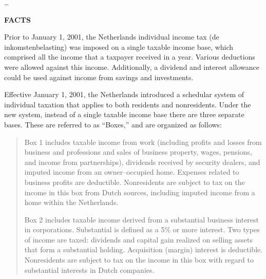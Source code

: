 \begin{select}
\ldots\\

\begin{center} \textbf{FACTS}
\end{center}

Prior to January 1, 2001, the Netherlands individual income tax (de inkomstenbelasting) was imposed on a single taxable income base, which comprised all the income that a taxpayer received in a year. Various deductions were allowed against this income. Additionally, a dividend and interest allowance could be used against income from savings and investments. 

Effective January 1, 2001, the Netherlands introduced a schedular system of individual taxation that applies to both residents and nonresidents. Under the new system, instead of a single taxable income base there are three separate 
bases. These are referred to as ``Boxes,'' and are organized as follows: 
\begin{quote}
Box 1 includes taxable income from work (including profits and losses from business and professions 
and sales of business property, wages, pensions, and income from partnerships), dividends received by 
security dealers, and imputed income from an owner--occupied home. Expenses related to business profits are 
deductible. Nonresidents are subject to tax on the income in this box from Dutch sources, including imputed 
income from a home within the Netherlands. 

Box 2 includes taxable income derived from a substantial business interest in corporations. Substantial is 
defined as a 5\% or more interest. Two types of income are taxed: dividends and capital gain realized on 
selling assets that form a substantial holding. Acquisition (margin) interest is deductible. Nonresidents are 
subject to tax on the income in this box with regard to substantial interests in Dutch companies. 


\end{quote}
\end{select}
